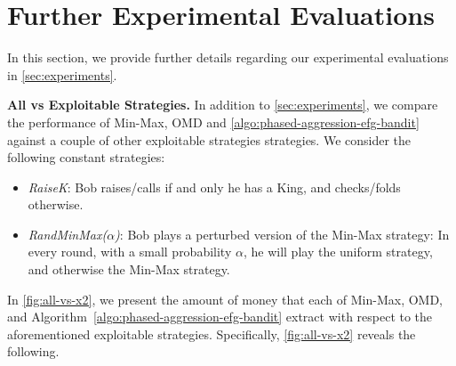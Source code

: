 \section{Further Experimental Evaluations} \label{app:further-experiments}

In this section, we provide further details regarding our experimental evaluations in \cref{sec:experiments}.

\noindent \textbf{All vs Exploitable Strategies.} In addition to \cref{sec:experiments}, we compare the performance of Min-Max, OMD and \cref{algo:phased-aggression-efg-bandit} against a couple of other exploitable strategies strategies. We consider the following constant strategies:

\begin{itemize}[leftmargin=*]
    \setlength{\itemsep}{0.3em}
    \setlength{\parskip}{0pt}
    \item \emph{RaiseK}: Bob raises/calls if and only he has a King, and checks/folds otherwise.
    \item \emph{RandMinMax($\alpha$)}: Bob plays a perturbed version of the Min-Max strategy: In every round, with a small probability $\alpha$, he will play the uniform strategy, and otherwise the Min-Max strategy. 
\end{itemize}

In \cref{fig:all-vs-x2}, we present the amount of money that each of Min-Max, OMD, and Algorithm~\ref{algo:phased-aggression-efg-bandit} extract with respect to the aforementioned exploitable strategies. Specifically, \cref{fig:all-vs-x2} reveals the following. 

